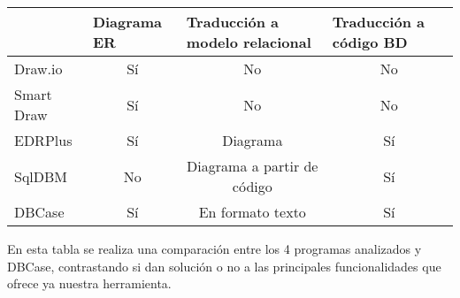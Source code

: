 \begin{table}[H]
\begin{tabular}{l|c|c|c|}
\cline{2-4}
                                 & \multicolumn{1}{l|}{\cellcolor[HTML]{D3F4FD}Diagrama ER} & \multicolumn{1}{l|}{\cellcolor[HTML]{D3F4FD}Traducción a modelo relacional} & \multicolumn{1}{l|}{\cellcolor[HTML]{D3F4FD}Traducción a código BD} \\ \hline
\multicolumn{1}{|l|}{Draw.io}    & Sí                                                       & No                                                                          & No                                                                  \\ \hline
\multicolumn{1}{|l|}{Smart Draw} & Sí                                                       & No                                                                          & No                                                                  \\ \hline
\multicolumn{1}{|l|}{EDRPlus}    & Sí                                                       & Diagrama                                                                    & Sí                                                                  \\ \hline
\multicolumn{1}{|l|}{SqlDBM}     & No                                                       & Diagrama a partir de código                                                 & Sí                                                                  \\ \hline
\multicolumn{1}{|l|}{DBCase}     & Sí                                                       & En formato texto                                                            & Sí                                                                  \\ \hline
\end{tabular}
\end{table}

En esta tabla se realiza una comparación entre los 4 programas analizados y DBCase, contrastando si dan solución o no a las principales funcionalidades que ofrece ya nuestra herramienta.\\

